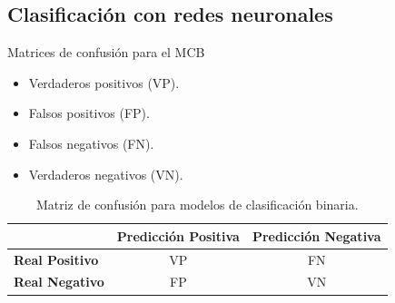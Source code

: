 \subsection{Clasificación con redes neuronales}
\begin{frame}{Matrices de confusión para el MCB}
\begin{itemize}
	\item \small Verdaderos positivos (VP).
    \item \small Falsos positivos (FP).
    \item \small Falsos negativos (FN).
    \item \small Verdaderos negativos (VN).
\end{itemize}

\begin{table}[H]
\centering
\begin{tabular}{|l|c|c|}
\hline
 & \textbf{Predicción Positiva} & \textbf{Predicción Negativa} \\ \hline
\textbf{Real Positivo} & VP & FN \\ \hline
\textbf{Real Negativo} & FP & VN \\ \hline
\end{tabular}
\caption{Matriz de confusión para modelos de clasificación binaria.}
\label{tab:confusion_matrix}
\end{table}
\end{frame}


